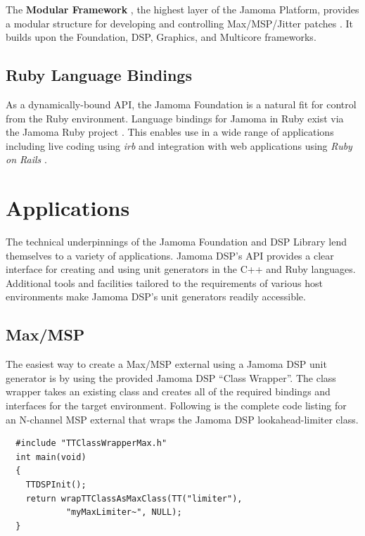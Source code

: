\documentclass[twoside,10pt]{article}
\begin{document}
The \textbf{Modular Framework} \cite{web13}, the highest layer of the Jamoma Platform, provides a modular structure for developing  and controlling Max/MSP/Jitter patches \cite{Place:2006}. It builds upon the Foundation, DSP, Graphics, and Multicore frameworks.



\subsection{Ruby Language Bindings} %

As a dynamically-bound API, the Jamoma Foundation is a natural fit for control from the Ruby environment.  Language bindings for Jamoma in Ruby exist via the Jamoma Ruby project \cite{web14}.  This enables use in a wide range of applications including live coding using \emph{irb} \cite{web15} and integration with web applications using \emph{Ruby on Rails} \cite{web16}.




\section{Applications} %

The technical underpinnings of the Jamoma Foundation and DSP Library lend themselves to a variety of applications. 
Jamoma DSP's API provides a clear interface for creating and using unit generators in the C++ and Ruby languages.  Additional tools and facilities tailored to the requirements of various host environments make Jamoma DSP's unit generators readily accessible.


\subsection{Max/MSP} \label{sec:classwrapper}

The easiest way to create a Max/MSP external using a Jamoma DSP unit generator is by using the provided Jamoma DSP ``Class Wrapper''.   The class wrapper  takes an existing class and creates all of the required bindings and interfaces for the target environment.  Following is the complete code listing for an N-channel MSP external that wraps the Jamoma DSP lookahead-limiter class.

\begin{lstlisting}
  #include "TTClassWrapperMax.h"
  int main(void)
  {
    TTDSPInit();
    return wrapTTClassAsMaxClass(TT("limiter"), 
            "myMaxLimiter~", NULL);
  }
\end{lstlisting}
\end{document}
